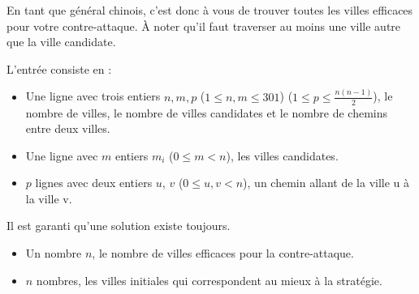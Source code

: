 En tant que général chinois, c'est donc à vous de trouver toutes les villes efficaces pour votre contre-attaque. À noter qu'il faut traverser au moins une ville autre que la ville candidate.

\begin{Input}
    L'entrée consiste en :
    \begin{itemize}
        \item Une ligne avec trois entiers $n, m, p$ ($1 \leq n, m\leq 301$) ($1 \leq p \leq \frac{n (n-1)}{2}$), le nombre de villes, le nombre de villes candidates et le nombre de chemins entre deux villes.
        \item Une ligne avec $m$ entiers $m_i$ ($0 \leq m < n$), les villes candidates.
        \item $p$ lignes avec deux entiers $u$, $v$ ($0 \leq u, v < n$), un chemin allant de la ville u à la ville v.
    \end{itemize}
    Il est garanti qu'une solution existe toujours.
\end{Input}

\begin{Output}
    \begin{itemize}
        \item Un nombre $n$, le nombre de villes efficaces pour la contre-attaque.
        \item $n$ nombres, les villes initiales qui correspondent au mieux à la stratégie.
    \end{itemize}
\end{Output}
